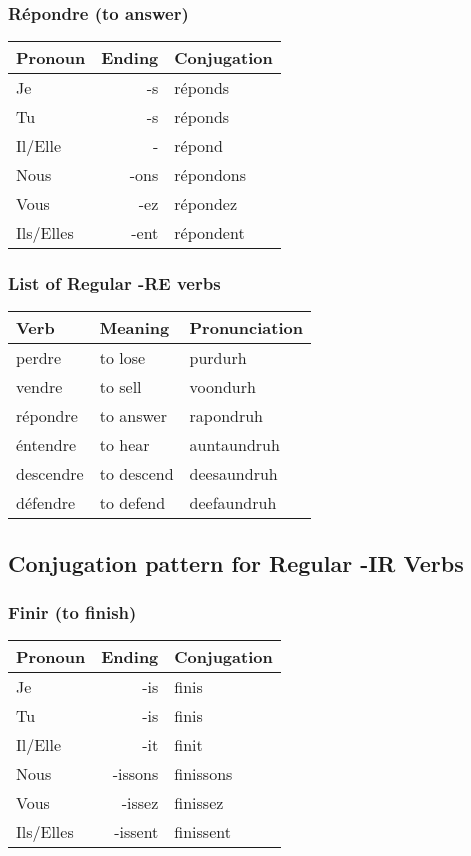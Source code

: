\subsubsection{R\'epondre (to answer)}
\begin{tabular}{| l | r | l |}
\hline
Pronoun 	& 	Ending 	& 	Conjugation	\\ 	\hline
Je		    &	-s	    & 	r\'eponds   \\ 	\hline
Tu		    &	-s	    &	r\'eponds   \\	\hline
Il/Elle		&	-	    &	r\'epond    \\	\hline
Nous		&	-ons	&	r\'epondons \\	\hline
Vous		&	-ez	    &	r\'epondez  \\	\hline
Ils/Elles	&	-ent	&	r\'epondent \\	\hline
\end{tabular}

\subsubsection{List of Regular -RE verbs}
\begin{longtable}{| l | l | l |}
\hline
Verb 		& Meaning 		& Pronunciation	\\
\hline
\endhead
perdre      & to lose       & purdurh       \\ 	\hline
vendre      & to sell       & voondurh      \\	\hline
r\'epondre  & to answer     & rapondruh     \\	\hline
\'entendre  & to hear       & auntaundruh   \\	\hline
descendre   & to descend    & deesaundruh   \\	\hline
d\'efendre   & to defend     & deefaundruh   \\	\hline
\end{longtable}

\subsection{Conjugation pattern for Regular -IR Verbs}

\subsubsection{Finir (to finish)}
\begin{tabular}{| l | r | l |}
\hline
Pronoun 	& 	Ending 	& 	Conjugation	\\ 	\hline
Je		    &	-is	    & 	finis       \\ 	\hline
Tu		    &	-is	    &	finis       \\	\hline
Il/Elle		&	-it	    &	finit       \\	\hline
Nous		&	-issons &	finissons   \\	\hline
Vous		&	-issez  &	finissez    \\	\hline
Ils/Elles	&	-issent	&	finissent   \\	\hline
\end{tabular}

